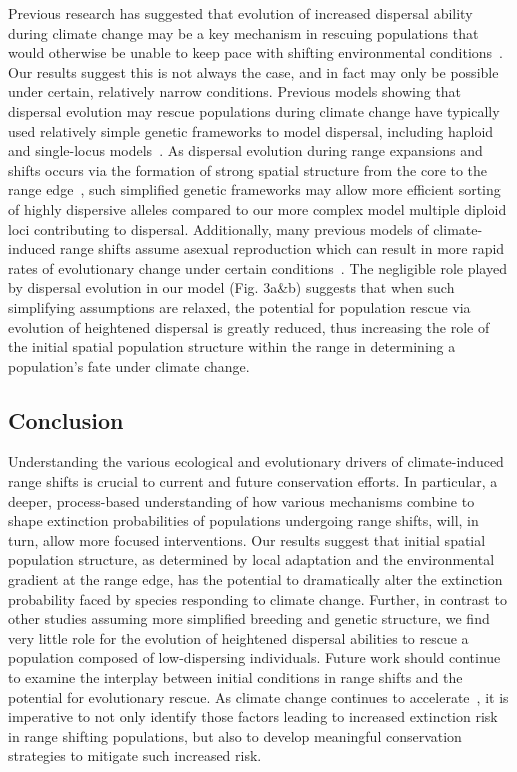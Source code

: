 \documentclass[12pt, oneside]{article}
\begin{document}
Previous research has suggested that evolution of increased dispersal ability during climate change may be a key mechanism in rescuing populations that would otherwise be unable to keep pace with shifting environmental conditions~\citep{boeye2013more}. Our results suggest this is not always the case, and in fact may only be possible under certain, relatively narrow conditions. Previous models showing that dispersal evolution may rescue populations during climate change have typically used relatively simple genetic frameworks to model dispersal, including haploid and single-locus models~\citep{boeye2013more, hargreaves2015fitness}. As dispersal evolution during range expansions and shifts occurs via the formation of strong spatial structure from the core to the range edge~\citep{shine2011evolutionary}, such simplified genetic frameworks may allow more efficient sorting of highly dispersive alleles compared to our more complex model multiple diploid loci contributing to dispersal. Additionally, many previous models of climate-induced range shifts assume asexual reproduction which can result in more rapid rates of evolutionary change under certain conditions~\citep{crow1965evolution, smith1968evolution}. The negligible role played by dispersal evolution in our model (Fig. 3a\&b) suggests that when such simplifying assumptions are relaxed, the potential for population rescue via evolution of heightened dispersal is greatly reduced, thus increasing the role of the initial spatial population structure within the range in determining a population's fate under climate change.

\subsection*{Conclusion}
Understanding the various ecological and evolutionary drivers of climate-induced range shifts is crucial to current and future conservation efforts. In particular, a deeper, process-based understanding of how various mechanisms combine to shape extinction probabilities of populations undergoing range shifts, will, in turn, allow more focused interventions. Our results suggest that initial spatial population structure, as determined by local adaptation and the environmental gradient at the range edge, has the potential to dramatically alter the extinction probability faced by species responding to climate change. Further, in contrast to other studies assuming more simplified breeding and genetic structure, we find very little role for the evolution of heightened dispersal abilities to rescue a population composed of low-dispersing individuals. Future work should continue to examine the interplay between initial conditions in range shifts and the potential for evolutionary rescue. As climate change continues to accelerate~\citep{chen2017increasing}, it is imperative to not only identify those factors leading to increased extinction risk in range shifting populations, but also to develop meaningful conservation strategies to mitigate such increased risk.
\end{document}
